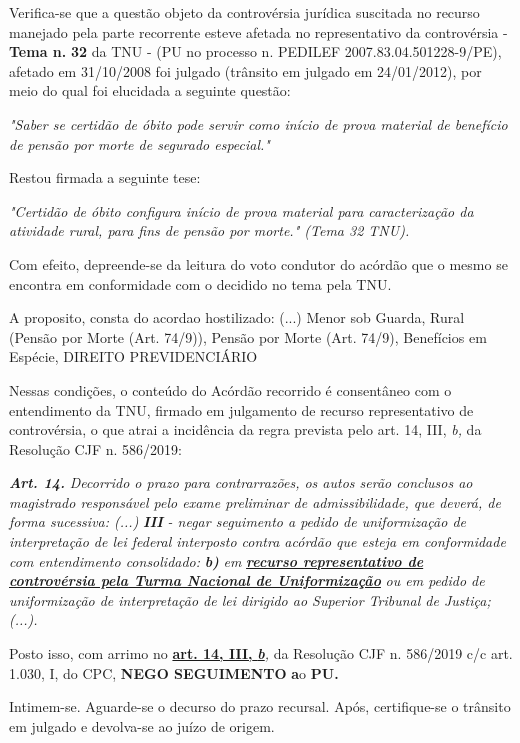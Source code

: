 \documentclass[12pt]{article}
\begin{document}
\justifying
\noindent Verifica-se que a questão objeto da controvérsia jurídica suscitada no recurso manejado pela parte recorrente esteve afetada no representativo da controvérsia - \textbf{Tema n. }\textbf{32} da TNU - (PU no processo n. PEDILEF 2007.83.04.501228-9/PE),  afetado em 31/10/2008 foi julgado (trânsito em julgado em 24/01/2012), por meio do qual foi elucidada a seguinte questão:

\noindent \textit{"Saber se certidão de óbito pode servir como início de prova material de benefício de pensão por morte de segurado especial."}

\noindent Restou firmada a seguinte tese:

\noindent \textit{"Certidão de óbito configura início de prova material para caracterização da atividade rural, para fins de pensão por morte." (Tema 32 TNU).}

\noindent Com efeito, depreende-se da leitura do voto condutor do acórdão que o mesmo se encontra em conformidade com o decidido no  tema pela TNU.

\noindent A proposito, consta do acordao hostilizado: (...) Menor sob Guarda, Rural (Pensão por Morte (Art. 74/9)), Pensão por Morte (Art. 74/9), Benefícios em Espécie, DIREITO PREVIDENCIÁRIO

\noindent Nessas condições, o conteúdo do Acórdão recorrido é consentâneo com o entendimento da TNU, firmado em julgamento de recurso representativo de controvérsia, o que atrai a incidência da regra prevista pelo art. 14, III, \textit{b,} da Resolução CJF n. 586/2019:

\noindent \textit{\textbf{Art. 14.}}\textit{ Decorrido o prazo para contrarrazões, os autos serão conclusos ao magistrado responsável pelo exame preliminar de admissibilidade, que deverá, de forma sucessiva: (...) }\textit{\textbf{III }}\textit{- negar seguimento a pedido de uniformização de interpretação de lei federal interposto contra acórdão que esteja em conformidade com entendimento consolidado: }\textit{\textbf{b)}}\textit{ em }\uline{\textit{\textbf{recurso representativo de controvérsia pela Turma Nacional de Uniformização}}}\textit{ ou em pedido de uniformização de interpretação de lei dirigido ao Superior Tribunal de Justiça;(...).}

\noindent Posto isso, com arrimo no \uline{\textbf{art. 14, III, }}\uline{\textit{\textbf{b}}}\textit{,} da Resolução CJF n. 586/2019 c/c art. 1.030, I, do CPC, \textbf{NEGO SEGUIMENTO }\textbf{a}o\textbf{ PU}\textbf{.}

\noindent Intimem-se. Aguarde-se o decurso do prazo recursal. Após, certifique-se o trânsito em julgado e devolva-se ao juízo de origem.
\end{document}
